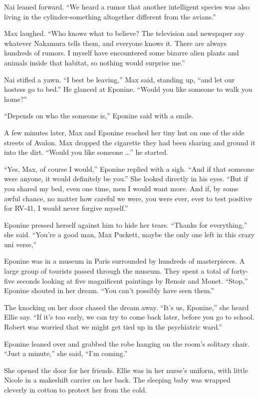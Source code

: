 \documentclass[]{article}
\begin{document}
{{Nai leaned forward. “We heard a rumor that another intelligent species was also living in the cylinder-something altogether different from the avians.”

Max laughed. “Who knows what to believe? The television and newspaper say whatever Nakamura tells them, and everyone knows it. There are always hundreds of rumors. I myself have encountered some bizarre alien plants and animals inside that habitat, so nothing would surprise me.”

Nai stifled a yawn. “I best be leaving,” Max said, standing up, “and let our hostess go to bed.” He glanced at Eponine. “Would you like someone to walk you home?”

“Depends on who the someone is,” Eponine said with a smile.

A few minutes later, Max and Eponine reached her tiny hut on one of the side streets of Avalon. Max dropped the cigarette they had been sharing and ground it into the dirt. “Would you like someone …” he started.

“Yes, Max, of course I would,” Eponine replied with a sigh. “And if that someone were anyone, it would definitely be you.” She looked directly in his eyes. “But if you shared my bed, even one time, men I would want more. And if, by some awful chance, no matter how careful we were, you were ever, ever to test positive for RV-41, I would never forgive myself.”

Eponine pressed herself against him to hide her tears. “Thanks for everything,” she said. “You’re a good man, Max Puckett, maybe the only one left in this crazy uni verse,”

Eponine was in a museum in Paris surrounded by hundreds of masterpieces. A large group of tourists passed through the museum. They spent a total of forty-five seconds looking at five magnificent paintings by Renoir and Monet. “Stop,” Eponine shouted in her dream. “You can’t possibly have seen them.”

The knocking on her door chased the dream away. “It’s us, Eponine,” she heard Ellie say. “If it’s too early, we can try to come back later, before you go to school. Robert was worried that we might get tied up in the psychiatric ward.”

Eponine leaned over and grabbed the robe hanging on the room’s solitary chair. “Just a minute,” she said, “I’m coming.”

She opened the door for her friends. Ellie was in her nurse’s uniform, with little Nicole in a makeshift carrier on her back. The sleeping baby was wrapped cleverly in cotton to protect her from the cold.

}}
\end{document}
